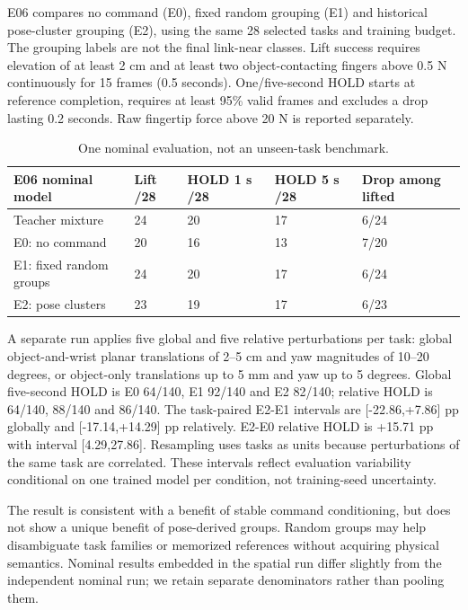 \documentclass[10pt,twocolumn]{article}
\begin{document}
E06 compares no command (E0), fixed random grouping (E1) and historical pose-cluster grouping (E2), using the same 28 selected tasks and training budget. The grouping labels are not the final link-near classes. Lift success requires elevation of at least 2 cm and at least two object-contacting fingers above 0.5 N continuously for 15 frames (0.5 seconds). One/five-second HOLD starts at reference completion, requires at least 95\% valid frames and excludes a drop lasting 0.2 seconds. Raw fingertip force above 20 N is reported separately.

\begin{table}[t]
\small
\begin{tabularx}{\textwidth}{@{}lXXXX@{}}
\toprule
E06 nominal model & Lift /28 & HOLD 1 s /28 & HOLD 5 s /28 & Drop among lifted \\
\midrule
Teacher mixture & 24 & 20 & 17 & 6/24 \\
E0: no command & 20 & 16 & 13 & 7/20 \\
E1: fixed random groups & 24 & 20 & 17 & 6/24 \\
E2: pose clusters & 23 & 19 & 17 & 6/23 \\
\bottomrule
\end{tabularx}
\caption{One nominal evaluation, not an unseen-task benchmark.}
\end{table}

A separate run applies five global and five relative perturbations per task: global object-and-wrist planar translations of 2--5 cm and yaw magnitudes of 10--20 degrees, or object-only translations up to 5 mm and yaw up to 5 degrees. Global five-second HOLD is E0 64/140, E1 92/140 and E2 82/140; relative HOLD is 64/140, 88/140 and 86/140. The task-paired E2-E1 intervals are [-22.86,+7.86] pp globally and [-17.14,+14.29] pp relatively. E2-E0 relative HOLD is +15.71 pp with interval [4.29,27.86]. Resampling uses tasks as units because perturbations of the same task are correlated. These intervals reflect evaluation variability conditional on one trained model per condition, not training-seed uncertainty.

The result is consistent with a benefit of stable command conditioning, but does not show a unique benefit of pose-derived groups. Random groups may help disambiguate task families or memorized references without acquiring physical semantics. Nominal results embedded in the spatial run differ slightly from the independent nominal run; we retain separate denominators rather than pooling them.
\end{document}
